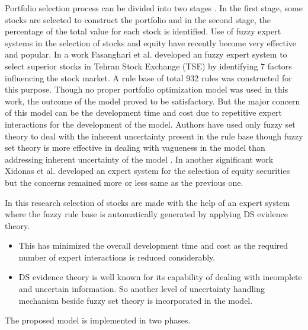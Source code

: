 \documentclass{ws-ijufks}
\begin{document}
Portfolio selection process can be divided into two stages \cite{Xidonas2009}. In the first stage, some stocks are 
selected to construct the portfolio and in the second stage, the percentage of the total value for each stock is 
identified. Use of fuzzy expert systems in the selection of stocks and equity have recently become very effective and 
popular. In a work Fasanghari et al. \cite{Fasanghari2010design} developed an fuzzy expert system to select superior 
stocks in Tehran Stock Exchange (TSE) by identifying $7$ factors influencing the stock market. A rule base of total 932 
rules was constructed for this purpose. Though no proper portfolio optimization model was used in this work, the 
outcome of the model proved to be satisfactory. But the major concern of this model can be the development time and 
cost due to repetitive expert interactions for the development of the model. Authors have used only fuzzy set theory to 
deal with the inherent uncertainty present in the rule base though fuzzy set theory is more effective in dealing with 
vagueness in the model than addressing inherent uncertainty of the model \cite{Rodriguez2012hesitant}. In another 
significant work Xidonas et al.\cite{Xidonas2009} developed an expert system for the selection of equity securities but 
the concerns remained more or less same as the previous one.

In this research selection of stocks are made with the help of an expert system where the fuzzy rule base is 
automatically generated by applying DS evidence theory. 
\begin{itemize}
	\item This has minimized the overall development time and cost as the required number of expert interactions is 
	reduced considerably.
	\item  DS evidence	theory is well known for its capability of dealing with incomplete and uncertain information. 
	So another level of	uncertainty handling mechanism beside fuzzy set theory is incorporated in the model.
\end{itemize}
The proposed model is implemented in two phases.
\end{document}

